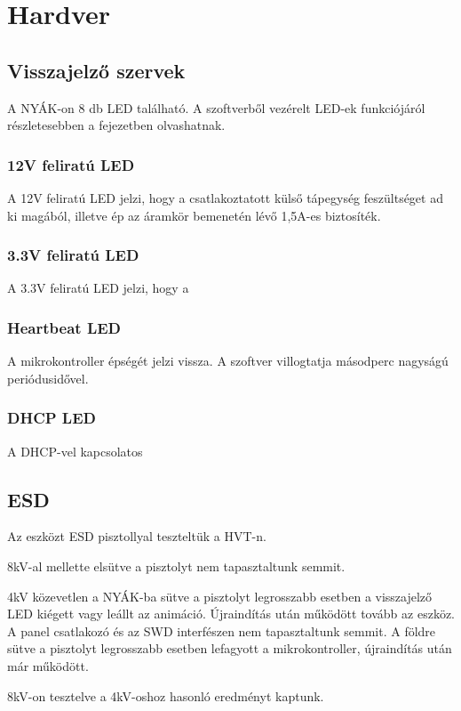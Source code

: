 \chapter{Hardver}

\section{Visszajelző szervek}
A NYÁK-on 8 db LED található.
A szoftverből vezérelt LED-ek funkciójáról részletesebben a %
fejezetben olvashatnak.

\subsection{12V feliratú LED}
A 12V feliratú LED jelzi, hogy a csatlakoztatott külső tápegység feszültséget ad ki magából, illetve ép az áramkör bemenetén lévő 1,5A-es biztosíték.
\subsection{3.3V feliratú LED}
A 3.3V feliratú LED jelzi, hogy a %

\subsection{Heartbeat LED}
A mikrokontroller épségét jelzi vissza. A szoftver villogtatja másodperc nagyságú periódusidővel.
\subsection{DHCP LED}
A DHCP-vel kapcsolatos 

\section{ESD}
Az eszközt ESD pisztollyal teszteltük a HVT-n. \par
8kV-al mellette elsütve a pisztolyt nem tapasztaltunk semmit.
\par
4kV közevetlen a NYÁK-ba sütve a pisztolyt legrosszabb esetben a visszajelző LED kiégett vagy leállt az animáció. Újraindítás után működött tovább az eszköz.
A panel csatlakozó és az SWD interfészen nem tapasztaltunk semmit.
A földre sütve a pisztolyt legrosszabb esetben lefagyott a mikrokontroller, újraindítás után már működött.
\par
8kV-on tesztelve a 4kV-oshoz hasonló eredményt kaptunk.

